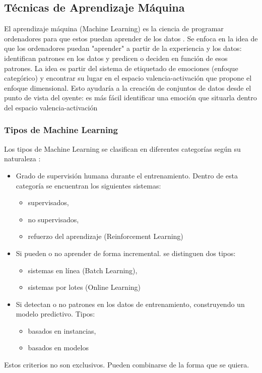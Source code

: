 \documentclass[12pt,a4paper,Spanish]{article}
\begin{document}
\subsection{Técnicas de Aprendizaje Máquina}

El aprendizaje máquina (Machine Learning) es la ciencia de programar ordenadores para que estos puedan aprender de los datos \cite{geron2022hands}. Se enfoca en la idea de que los ordenadores puedan "aprender" a partir de la experiencia y los datos: identifican patrones en los datos y predicen o deciden en función de esos patrones. La idea es partir del sistema de etiquetado de emociones (enfoque categórico) y encontrar su lugar en el espacio valencia-activación que propone el enfoque dimensional. Esto ayudaría a la creación de conjuntos de datos desde el punto de vista del oyente: es más fácil identificar una emoción que situarla dentro del espacio valencia-activación 

\subsubsection{Tipos de Machine Learning}
Los tipos de Machine Learning se clasifican en diferentes categorías según su naturaleza \cite{geron2022hands}:
\begin{itemize}
	\item Grado de supervisión humana durante el entrenamiento. Dentro de esta categoría se encuentran los siguientes sistemas:
	\begin{itemize}
		\item supervisados,
		\item no supervisados,
		\item refuerzo del aprendizaje (Reinforcement Learning)
	\end{itemize}
	\item Si pueden o no aprender de forma incremental. se distinguen dos tipos:
	\begin{itemize}
		\item sistemas en línea (Batch Learning),
		\item sistemas por lotes (Online Learning)
	\end{itemize}
	\item Si detectan o no patrones en los datos de entrenamiento, construyendo un modelo predictivo. Tipos:
	\begin{itemize}
		\item basados en instancias,
		\item basados en modelos
	\end{itemize}
\end{itemize}
Estos criterios no son exclusivos. Pueden combinarse de la forma que se quiera.
\end{document}
